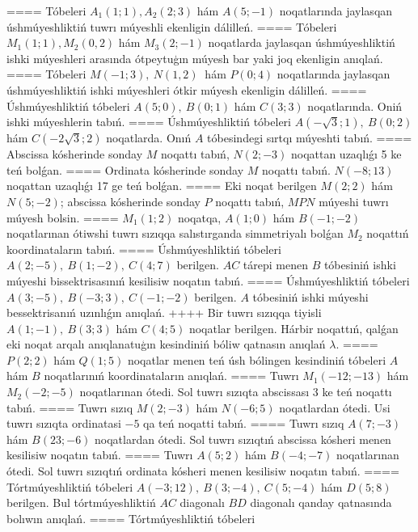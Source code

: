 ====
Tóbeleri $A_1 (1; 1), A_2 (2; 3) $ hám $A (5;-1) $
noqatlarında jaylasqan úshmúyeshliktiń tuwrı múyeshli ekenligin dálilleń.
====
Tóbeleri \(M_{1} (1;1), M_{2} (0,2) \) hám
\(M_{3} (2;-1) \) noqatlarda jaylasqan úshmúyeshliktiń ishki
múyeshleri arasında ótpeytuģın múyesh bar yaki joq ekenligin anıqlań.
====
Tóbeleri \(M (-1;3),\ N (1,2) \ \) hám \(P (0;4) \)
noqatlarında jaylasqan úshmúyeshliktiń ishki múyeshleri ótkir múyesh
ekenligin dálilleń.
====
Úshmúyeshliktiń tóbeleri \(A (5;0),\ B (0;1) \) hám \(C (3;3) \)
noqatlarında. Oniń ishki múyeshlerin tabıń.
====
Úshmúyeshliktiń tóbeleri
\(A\left(-\sqrt{3};1 \right),\ B (0;2) \) hám
\(C\left(-2\sqrt{3};2 \right) \) noqatlarda. Onıń $A$
tóbesindegi sırtqı múyeshti tabıń.
====
Abscissa kósherinde sonday $M$ noqattı tabıń,
\(N (2;-3) \) noqattan uzaqlıǵı 5 ke teń bolǵan.
====
Ordinata kósherinde sonday $M$ noqattı tabıń.
\(N (-8;13) \) noqattan uzaqlıǵı 17 ge teń bolǵan.
====
Eki noqat berilgen \(M (2;2) \) hám \(N (5;-2) \); abscissa kósherinde sonday $P$ noqattı tabıń, $MPN$ múyeshi tuwrı múyesh bolsin.
====
\(M_{1} (1;2) \) noqatqa, \(A (1;0) \) hám \(B (-1;-2) \)
noqatlarınan ótiwshi tuwrı sızıqqa salıstırganda simmetriyalı bolǵan \(M_{2}\) noqattıń koordinataların tabıń.
====
Úshmúyeshliktiń tóbeleri \(A (2;-5),\ B (1;-2),\ C (4;7) \)
berilgen. $AC$ tárepi menen $B$ tóbesiniń ishki múyeshi
bissektrisasınıń kesilisiw noqatın tabıń.
====
Úshmúyeshliktiń tóbeleri
\(A (3;-5),\ B (-3;3),\ C (-1;-2) \) berilgen. $A$ tóbesiniń ishki
múyeshi bessektrisanıń uzınlıǵın anıqlań.
++++
Bir tuwrı sızıqqa tiyisli \(A (1;-1),\ B (3;3) \) hám
\(C (4;5) \) noqatlar berilgen. Hárbir noqattıń, qalǵan eki noqat arqalı anıqlanatuģın kesindiniń bóliw qatnasın anıqlań $\lambda$.
====
\(P (2;2) \) hám \(Q (1;5) \) noqatlar menen teń úsh
bólingen kesindiniń tóbeleri $A$ hám $B$ noqatlarınıń
koordinataların anıqlań.
====
Tuwrı \(M_{1} (-12;-13) \) hám \(M_{2} (-2;-5) \)
noqatlarınan ótedi. Sol tuwrı sızıqta abscissası 3 ke teń noqattı tabıń.
====
Tuwrı sızıq \(M (2;-3) \) hám \(N (-6;5) \) noqatlardan ótedi.
Usi tuwrı sızıqta ordinatasi $-5$ qa teń noqatti tabıń.
====
Tuwrı sızıq \(A (7;-3) \) hám \(B (23;-6) \) noqatlardan ótedi.
Sol tuwrı sızıqtıń abscissa kósheri menen kesilisiw noqatın tabıń.
====
Tuwrı \(A (5;2) \) hám \(B (-4; -7) \) noqatlarınan ótedi.
Sol tuwrı sızıqtıń ordinata kósheri menen kesilisiw noqatın tabıń.
====
Tórtmúyeshliktiń tóbeleri
\(A (-3;12),\ B (3;-4),\ C (5;-4) \) hám \(D (5;8) \) berilgen. Bul
tórtmúyeshliktiń $AC$ diagonalı $BD$ diagonalı qanday
qatnasında bolıwın anıqlań.
====
Tórtmúyeshliktiń tóbeleri
